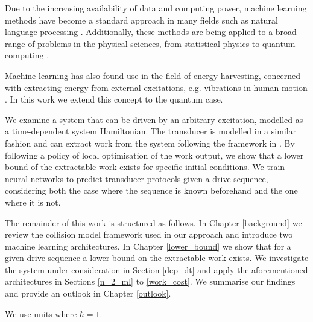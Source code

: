 Due to the increasing availability of data and computing power, machine learning methods have become a standard approach in many fields such as natural language processing \cite{DBLP:journals/corr/VaswaniSPUJGKP17}.
Additionally, these methods are being applied to a broad range of problems in the physical sciences, from statistical physics to quantum computing \cite{Carleo_2019, wise2021using}.

Machine learning has also found use in the field of energy harvesting, concerned with extracting energy from external excitations, e.g. vibrations in human motion \cite{Liu2019}.
In this work we extend this concept to the quantum case.

We examine a system that can be driven by an arbitrary excitation, modelled as a time-dependent system Hamiltonian.
The transducer is modelled in a similar fashion and can extract work from the system following the framework in \cite{beyer2020}.
By following a policy of local optimisation of the work output, we show that a lower bound of the extractable work exists for specific initial conditions.
We train neural networks to predict transducer protocols given a drive sequence, considering both the case where the sequence is known beforehand and the one where it is not.

The remainder of this work is structured as follows.
In Chapter \ref{background} we review the collision model framework used in our approach and introduce two machine learning architectures.
In Chapter \ref{lower_bound} we show that for a given drive sequence a lower bound on the extractable work exists.
We investigate the system under consideration in Section \ref{dep_dt} and apply the aforementioned architectures in Sections \ref{n_2_ml} to \ref{work_cost}.
We summarise our findings and provide an outlook in Chapter \ref{outlook}.

We use units where $\hbar = 1$.